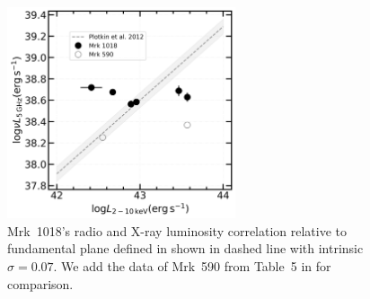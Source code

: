 \documentclass[twocolumn]{aastex63}
\begin{document}
\begin{figure}
\centering
	\includegraphics[width=0.6\textwidth]{./pic/Mrk1018_Mrk590_radio_xray_Plotkin2012_Lx.png}
    \caption{Mrk~1018's radio and X-ray luminosity correlation relative to fundamental plane defined in \citet{2012MNRAS.419..267P} shown in dashed line with intrinsic $\sigma=0.07$. We add the data of Mrk~590 from Table~5 in \citet{2016MNRAS.460..304K} for comparison.} 
    \label{fig:radio-xray-mass_relation_Plotkin2012}
\end{figure}



%





\end{document}
